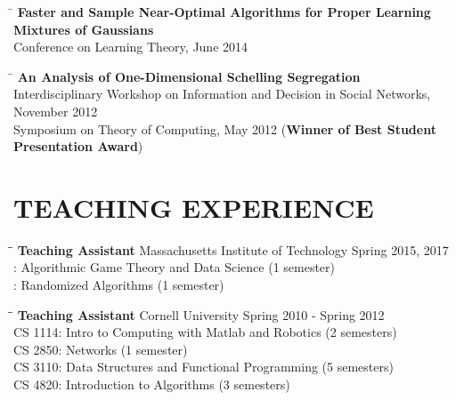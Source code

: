 \documentclass{res}
\begin{document}
\begin{resume}
    \vspace{-20pt}
    \begin{tabbing}
    \hspace{0.3in}\= \kill 
    {\bf Faster and Sample Near-Optimal Algorithms for Proper Learning Mixtures of Gaussians} \\
    \> Conference on Learning Theory, June 2014
    \end{tabbing}
    \vspace{-20pt}
    \begin{tabbing}
    \hspace{0.3in}\= \kill 
    {\bf An Analysis of One-Dimensional Schelling Segregation} \\
    \> Interdisciplinary Workshop on Information and Decision in Social Networks, November 2012 \\
    \> Symposium on Theory of Computing, May 2012 ({\bf Winner of Best Student Presentation Award})
    \end{tabbing}
    

\section{TEACHING EXPERIENCE}
   \vspace{-0.1in}	
   \begin{tabbing}
   \hspace{0.2in}\= \hspace{4.75in}\= \kill %
    {\bf Teaching Assistant} \hspace{0.95in}Massachusetts Institute of Technology \hspace{0.25in} Spring 2015, 2017\\
                       : Algorithmic Game Theory and Data Science \> (1 semester) \\
                       : Randomized Algorithms  \> (1 semester)
   \end{tabbing}
   \vspace{-0.3in}
   \begin{tabbing}
   \hspace{0.2in}\= \hspace{4.75in}\= \kill %
    {\bf Teaching Assistant} \hspace{0.95in}Cornell University \hspace{1.45in} Spring 2010 - Spring 2012\\
                       \>CS 1114: Intro to Computing with Matlab and Robotics  \> (2 semesters)\\
                       \>CS 2850: Networks  \> (1 semester)\\
                       \>CS 3110: Data Structures and Functional Programming \> (5 semesters)\\
                       \>CS 4820: Introduction to Algorithms  \> (3 semesters)\\
   \end{tabbing}
   \vspace{-20pt}



\end{resume}
\end{document}
